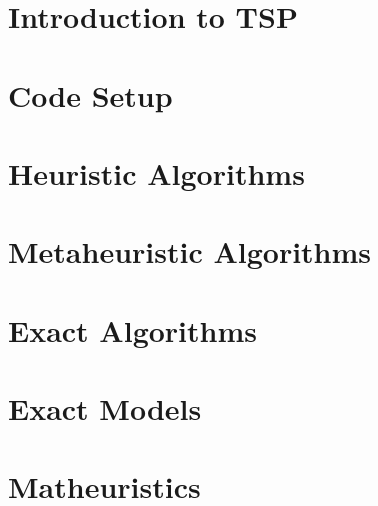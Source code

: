 \documentclass[a4paper,12pt]{book}
\begin{document}
\thispagestyle{empty} %
\cleardoublepage

\thispagestyle{empty}

\clearpage{\pagestyle{plain}\cleardoublepage}


\clearpage{\pagestyle{plain}\cleardoublepage}

\tableofcontents %

\clearpage{\pagestyle{plain}\cleardoublepage} %

\clearpage{\pagestyle{plain}\cleardoublepage} 
\chapter{Introduction to TSP} 
\label{chapter:intro} 


\clearpage{\pagestyle{plain}\cleardoublepage} 
\chapter{Code Setup} 
\label{chapter:code} 


\clearpage{\pagestyle{plain}\cleardoublepage} 
\chapter{Heuristic Algorithms} 
\label{chapter:heuristics} 
 

\clearpage{\pagestyle{plain}\cleardoublepage} 
\chapter{Metaheuristic Algorithms} 
\label{chapter:meta} 
 

\clearpage{\pagestyle{plain}\cleardoublepage} 
\chapter{Exact Algorithms} 
\label{chapter:exact} 



\clearpage{\pagestyle{plain}\cleardoublepage} 
\chapter{Exact Models} 
\label{chapter:exactAlgorithm} 



\clearpage{\pagestyle{plain}\cleardoublepage} 
\chapter{Matheuristics} 
\label{chapter:matheuristics} 



\clearpage{\pagestyle{plain}\cleardoublepage}

\nocite{*}

%
\end{document}
